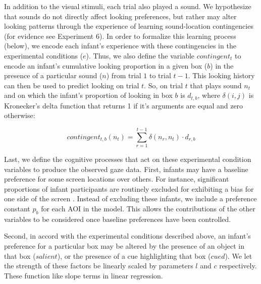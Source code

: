 \documentclass[12pt]{article}
\begin{document}
	In addition to the visual stimuli, each trial also played a sound. We hypothesize that sounds do not directly affect looking preferences, but rather may alter looking patterns through the experience of learning sound-location contingencies (for evidence see \cite{Wu2010a} Experiment 6). In order to formalize this learning process (below), we encode each infant's experience with these contingencies in the experimental conditions ($e$). Thus, we also define the variable $contingent_{t}$ to encode an infant's cumulative looking proportion in a given box ($b$) in the presence of a particular sound ($n$) from trial $1$ to trial $t-1$. This looking history can then be used to predict looking on trial $t$. So, on trial $t$ that plays sound $n_{t}$ and on which the infant's proportion of looking in box $b$ is $d_{t,b}$, where $\delta(i,j)$ is Kronecker’s delta function that returns 1 if it’s arguments are equal and zero otherwise:

\begin{equation}\label{eq:cont}
contingent_{t,b}(n_{t}) = \sum_{r=1}^{t-1} \delta(n_{r},n_{t}) \cdot d_{r,b}
\end{equation}

	Last, we define the cognitive processes that act on these experimental condition variables to produce the observed gaze data. First, infants may have a baseline preference for some screen locations over others. For instance, significant proportions of infant participants are routinely excluded for exhibiting a bias for one side of the screen \cite{Kelly2005, Farroni2005}. Instead of excluding these infants, we include a preference constant $p_{b}$ for each AOI in the model. This allows the contributions of the other variables to be considered once baseline preferences have been controlled. 

Second, in accord with the experimental conditions described above, an infant's preference for a particular box may be altered by the presence of an object in that box ($salient$), or the presence of a cue highlighting that box ($cued$). We let the strength of these factors be linearly scaled by parameters $l$ and $c$ respectively. These function like slope terms in linear regression.
\end{document}
